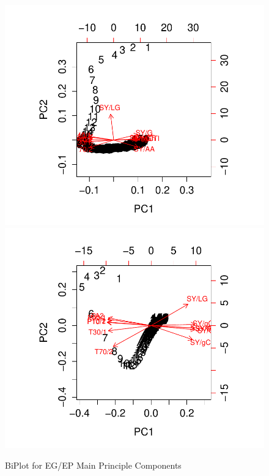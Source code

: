 \documentclass[twocolumn]{article}
\begin{document}
\begin{figure}[h!]
	\includegraphics[trim = 0mm 0mm 0mm 0mm, clip, scale=0.55]{EGBiPlot.pdf}
	\includegraphics[trim = 0mm 0mm 0mm 0mm, clip, scale=0.55]{EPBiPlot.pdf}
	\caption{BiPlot for EG/EP Main Principle Components}
	\label{fig:biplot}
\end{figure}
\end{document}
